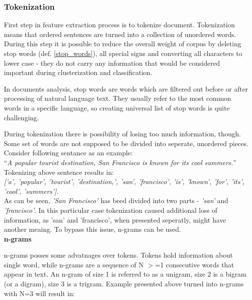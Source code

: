 \subsubsection{Tokenization}
First step in feature extraction process is to tokenize document. Tokenization means that ordered sentences are turned into a collection of unordered words. During this step it is possible to reduce the overall weight of corpus by deleting stop words (def. \ref{stop_words}), all special signs and converting all characters to lower case - they do not carry any information that would be considered important during clusterization and classification.\\

 \begin{definition}
 	\label{stop_words}
 	In documents analysis, stop words are words which are filtered out before or after processing of natural language text. They usually refer to the most common words in a specific language, so creating universal list of stop words is quite challenging.\\
 \end{definition}


During tokenization there is possibility of losing too much information, though. Some set of words are not supposed to be divided into seperate, unordered pieces. Consider following sentance as an example:\\

\textquotedblleft \textit{A popular tourist destination, San Francisco is known for its cool summers.}\textquotedblright\\

Tokenizing above sentence results in:\\

\textit{['a', 'popular', 'tourist', 'destination,', 'san', 'francisco', 'is', 'known', 'for', 'its', 'cool', 'summers'].}\\

As can be seen, \textit{'San Francisco'} has beed divided into two parts - \textit{'san'} and \textit{'francisco'}. In this particular case tokenization caused additional loss of information, as 'san' and 'francisco', when presented seperatly, might have another meaing. To bypass this issue, n-grams can be used.\\

\textbf{n-grams}

n-grams posses some advatnages over tokens. Tokens hold information about single word, while n-grams are a sequence of N $>$=1 consecutive words that appear in text. An n-gram of size 1 is referred to as a unigram, size 2 is a bigram (or a digram), size 3 is a trigram. Example presented above turned into n-grams with N=3 will result in:\\

